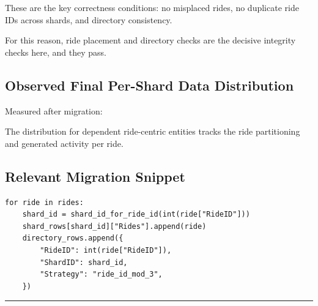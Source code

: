 \documentclass[12pt]{article}
\begin{document}
These are the key correctness conditions: no misplaced rides, no duplicate ride IDs across shards, and directory consistency.

For this reason, ride placement and directory checks are the decisive integrity checks here, and they pass.

\subsection{Observed Final Per-Shard Data Distribution}

Measured after migration:

\begin{table}[H]
\centering
\begin{minipage}{\textwidth}
\centering
{}
\end{minipage}
\end{table}

The distribution for dependent ride-centric entities tracks the ride partitioning and generated activity per ride.

\subsection{Relevant Migration Snippet}

\begin{verbatim}
for ride in rides:
    shard_id = shard_id_for_ride_id(int(ride["RideID"]))
    shard_rows[shard_id]["Rides"].append(ride)
    directory_rows.append({
        "RideID": int(ride["RideID"]),
        "ShardID": shard_id,
        "Strategy": "ride_id_mod_3",
    })
\end{verbatim}

\hrule
\vspace{0.75em}
\end{document}
